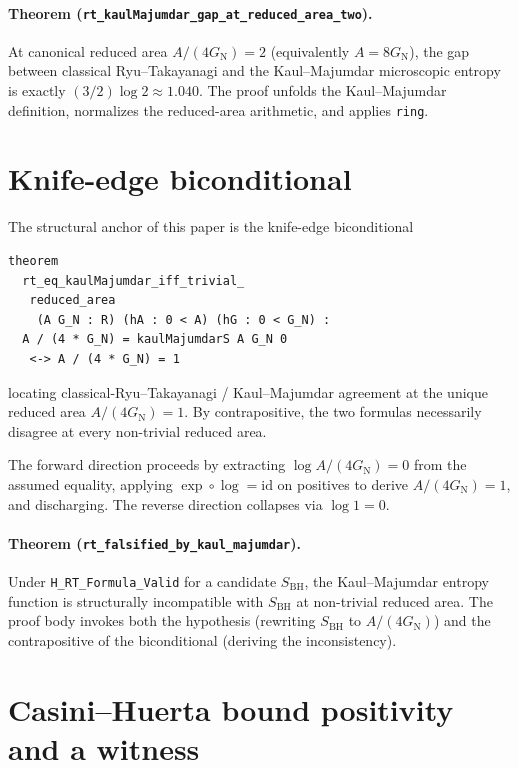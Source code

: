 \documentclass[twocolumn]{revtex4-2}
\newcommand{\GN}{G_{\mathrm{N}}}
\newcommand{\redArea}{A/(4\GN)}
\begin{document}
\paragraph*{Theorem
(\texttt{rt\_kaulMajumdar\_gap\_at\_reduced\_area\_two}).}
At canonical reduced area $A / (4 \GN) = 2$ (equivalently
$A = 8\GN$), the gap between classical Ryu--Takayanagi and the
Kaul--Majumdar microscopic entropy is exactly $(3/2)\log 2
\approx 1.040$. The proof unfolds the Kaul--Majumdar definition,
normalizes the reduced-area arithmetic, and applies \texttt{ring}.

\section{Knife-edge biconditional}
\label{sec:correctness_push}

The structural anchor of this paper is the knife-edge biconditional
\begin{verbatim}
theorem
  rt_eq_kaulMajumdar_iff_trivial_
   reduced_area
    (A G_N : R) (hA : 0 < A) (hG : 0 < G_N) :
  A / (4 * G_N) = kaulMajumdarS A G_N 0
   <-> A / (4 * G_N) = 1
\end{verbatim}
locating classical-Ryu--Takayanagi / Kaul--Majumdar agreement at the
unique reduced area $A / (4\GN) = 1$. By contrapositive, the two
formulas necessarily disagree at every non-trivial reduced area.

The forward direction proceeds by extracting
$\log\!\redArea = 0$ from the assumed equality, applying
$\exp \circ \log = \mathrm{id}$ on positives to derive
$\redArea = 1$, and discharging. The reverse direction collapses
via $\log 1 = 0$.

\paragraph*{Theorem (\texttt{rt\_falsified\_by\_kaul\_majumdar}).}
Under \texttt{H\_RT\_Formula\_Valid} for a candidate $S_{\mathrm{BH}}$,
the Kaul--Majumdar entropy function is structurally incompatible
with $S_{\mathrm{BH}}$ at non-trivial reduced area. The proof body
invokes both the hypothesis (rewriting $S_{\mathrm{BH}}$ to $\redArea$)
and the contrapositive of the biconditional (deriving the
inconsistency).

\section{Casini--Huerta bound positivity and a witness}
\label{sec:ch}
\end{document}
